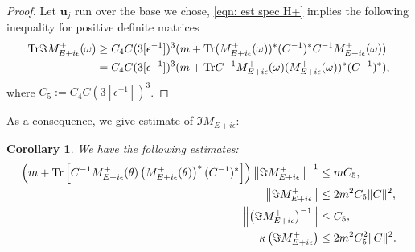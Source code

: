 \documentclass[11pt]{amsart}
\newtheorem{coro}[theorem]{Corollary}
\theoremstyle{remark}
\theoremstyle{definition}
\newcommand{\tr}{{\rm Tr}}
\DeclareMathOperator{\Tr}{{\rm Tr}}
\begin{document}
\begin{proof}
Let $\mathbf{u}_j$ run over the base we chose,  \eqref{eqn: est spec H+} implies the following inequality for positive definite matrices
\begin{equation*}
\begin{aligned}
	\tr\Im M_{E+i\epsilon}^+(\omega)&\geq  C_4C(3[\epsilon^{-1}])^3(m+\Tr(M_{E+i\epsilon}^+(\omega))^\ast(C^{-1})^*C^{-1} M_{E+i\epsilon}^+(\omega))\\
	&= C_4C(3[\epsilon^{-1}])^3(m+\tr C^{-1} M_{E+i\epsilon}^+(\omega)(M_{E+i\epsilon}^+(\omega))^\ast(C^{-1})^*),
\end{aligned}
\end{equation*}
where $C_5:=C_4C(3[\epsilon^{-1}])^3$.
\end{proof}

As a consequence, we give estimate of $\Im M_{E+i\epsilon}$:
\begin{coro}
We have the following estimates:
\begin{subequations}\label{coro:key-estimates}
\begin{align}
\label{key-eq-1}
\left(m + \tr\left[C^{-1} M_{E+i\epsilon}^+(\theta) \left(M_{E+i\epsilon}^+(\theta)\right)^\ast (C^{-1})^\ast\right]\right) \left\|\Im M^+_{E+i\epsilon}\right\|^{-1} &\leq m C_5, \\
\label{key-eq-2}
\left\|\Im M^+_{E+i\epsilon}\right\| &\leq 2m^2 C_5 \|C\|^2, \\
\label{key-eq-3}
\left\|\left(\Im M^+_{E+i\epsilon}\right)^{-1}\right\| &\leq C_5, \\
\label{key-eq-4}
\kappa\left(\Im M^+_{E+i\epsilon}\right) &\leq 2m^2 C_5^2 \|C\|^2.
\end{align}
\end{subequations}
\end{coro}
\end{document}
